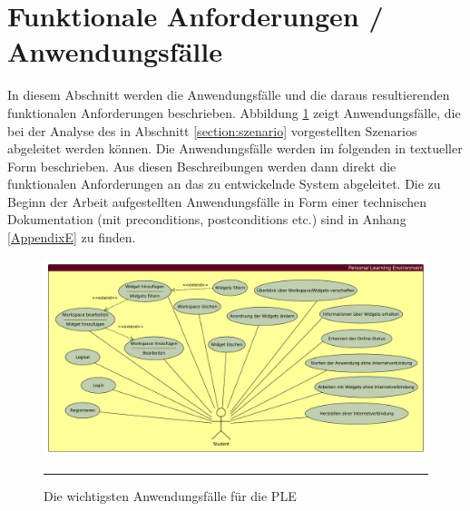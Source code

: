 \section{Funktionale Anforderungen / Anwendungsfälle}\label{section:anwendungsfaelle}
In diesem Abschnitt werden die Anwendungsfälle und die daraus resultierenden funktionalen Anforderungen beschrieben. Abbildung \ref{fig:anwendungsfaelle} zeigt Anwendungsfälle, die bei der Analyse des in Abschnitt \ref{section:szenario} vorgestellten Szenarios abgeleitet werden können. Die Anwendungsfälle werden im folgenden in textueller Form beschrieben. Aus diesen Beschreibungen werden dann direkt die funktionalen Anforderungen an das zu entwickelnde System abgeleitet. Die zu Beginn der Arbeit aufgestellten Anwendungsfälle in Form einer technischen Dokumentation (mit preconditions, postconditions etc.) sind in Anhang \ref{AppendixE} zu finden.

\begin{figure}[H]
  \centering
  \includegraphics[width=\textwidth,height=\textheight,keepaspectratio]{./Figures/anwendungsfaelle_quer.pdf}
    \rule{35em}{0.5pt}
  \caption[Anwendungsfälle der \ac{PLE}]{Die wichtigsten Anwendungsfälle für die \ac{PLE}}
  \label{fig:anwendungsfaelle}
\end{figure}

